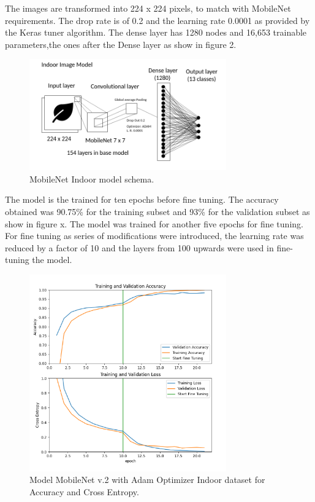 \documentclass[conference]{IEEEtran}
\begin{document}
The images are transformed into 224 x 224 pixels, to match with MobileNet requirements. The drop rate is of 0.2 and the learning rate 0.0001 as provided by the Keras tuner algorithm. The dense layer has 1280 nodes and 16,653 trainable parameters,the ones after the Dense layer as show in figure 2.
\begin{figure}[htbp]
\centerline{\includegraphics[width=8.5cm]{ModelIndoorsMobileNet.png}}
\caption{MobileNet Indoor model schema.}
\label{fig}
\end{figure}
    The model is the trained for ten epochs before fine tuning. The accuracy obtained was 90.75\% for the training subset and 93\% for the validation subset as show in figure x. The model was trained for another five epochs for fine tuning. For fine tuning as series of modifications were introduced, the learning rate was reduced by a factor of 10 and the layers from 100 upwards were used in fine-tuning the model. 
    
\begin{figure}[htbp]
\centerline{\includegraphics[width=8.5cm]{ModelIndoorsMobileNetEpochsAccuracychart.png}}
\caption{Model MobileNet v.2 with Adam Optimizer Indoor dataset for Accuracy and Cross Entropy.}
\label{fig}
\end{figure}
\end{document}
